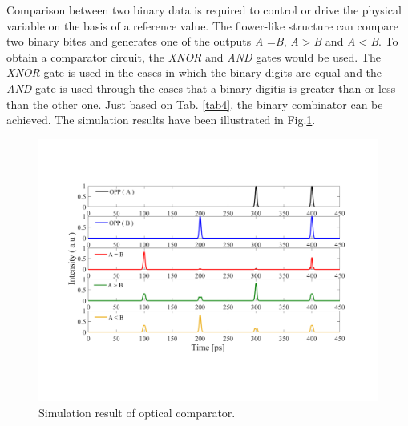\documentclass{osa-article}
\begin{document}
Comparison between two binary data is required to control or drive the physical variable on the basis of a reference value. The flower-like structure can compare two binary bites and generates one of the outputs \textit {A} =\textit {B}, \textit {A}$>$\textit {B} and \textit {A}$<$\textit {B}. To obtain a comparator circuit, the \textit{XNOR} and \textit{AND} gates would be used. The \textit{XNOR} gate is used in the cases in which the binary digits are equal and the \textit{AND} gate is used through the cases that a binary digitis is greater than or less than the other one. Just based on Tab. \ref{tab4}, the binary combinator can be achieved. The simulation results have been illustrated in Fig.\ref{fig4_comparator}.\\
\begin{figure}[tb]
\centering
\includegraphics[width=5 in]{figs/fig4_comparator.pdf}
	\caption{Simulation result of optical comparator.}
	\label{fig4_comparator}
\end{figure}
 
\end{document}

